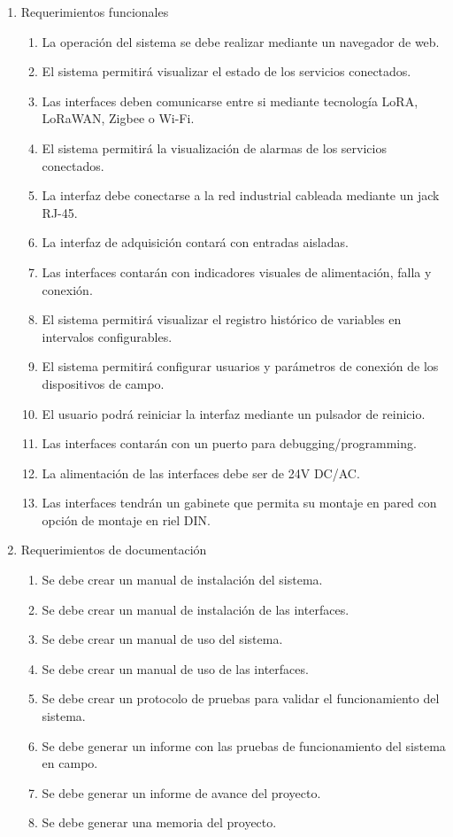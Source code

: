 \documentclass[
11pt, %
]{charter}
\begin{document}
\begin{enumerate}
	\item Requerimientos funcionales
		\begin{enumerate}
			\item La operación del sistema se debe realizar mediante un navegador de web.
			\item El sistema permitirá visualizar el estado de los servicios conectados.
			\item Las interfaces deben comunicarse entre si mediante tecnología LoRA, LoRaWAN, Zigbee o Wi-Fi.
			\item El sistema permitirá la visualización de alarmas de los servicios conectados.
			\item La interfaz debe conectarse a la red industrial cableada mediante un jack RJ-45.
			\item La interfaz de adquisición contará con entradas aisladas.
			\item Las interfaces contarán con indicadores visuales de alimentación, falla y conexión.
			\item El sistema permitirá visualizar el registro histórico de variables en intervalos configurables. 
			\item El sistema permitirá configurar usuarios y parámetros de conexión de los dispositivos de campo.
			\item El usuario podrá reiniciar la interfaz mediante un pulsador de reinicio.
		    \item Las interfaces contarán con un puerto para debugging/programming.
		    \item La alimentación de las interfaces debe ser de 24V DC/AC.
		    \item Las interfaces tendrán un gabinete que permita su montaje en pared con opción de montaje en riel DIN.
		\end{enumerate}

	\item Requerimientos de documentación
		\begin{enumerate}
			\item Se debe crear un manual de instalación del sistema.
			\item Se debe crear un manual de instalación de las interfaces.
			\item Se debe crear un manual de uso del sistema.
			\item Se debe crear un manual de uso de las interfaces.
			\item Se debe crear un protocolo de pruebas para validar el funcionamiento del sistema.
			\item Se debe generar un informe con las pruebas de funcionamiento del sistema en campo.
			\item Se debe generar un informe de avance del proyecto.
			\item Se debe generar una memoria del proyecto.


\end{enumerate}
\end{enumerate}
\end{document}
